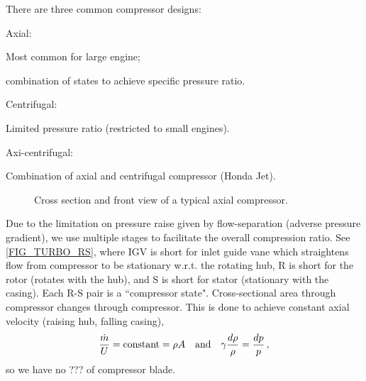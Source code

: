 There are three common compressor designs:
\begin{itemizePacked}
\item Axial:
  \begin{itemizePacked}
  \item Most common for large engine;
  \item combination of states to achieve specific pressure ratio.
  \end{itemizePacked}
\item Centrifugal:
  \begin{itemizePacked}
  \item Limited pressure ratio (restricted to small engines).
  \end{itemizePacked}
\item Axi-centrifugal:
  \begin{itemizePacked}
  \item Combination of axial and centrifugal compressor (Honda Jet).
  \end{itemizePacked}
\end{itemizePacked}

\begin{figure}[!htb!]
 \centering
    \caption{\label{FIG_TURBO_R}Cross section and front view of a typical axial compressor.}
\end{figure}

Due to the limitation on pressure raise given by flow-separation (adverse pressure gradient), we use multiple stages to facilitate the overall compression ratio. See \cref{FIG_TURBO_RS}, where IGV is short for inlet guide vane which straightens flow from compressor to be stationary w.r.t. the rotating hub, R is short for the rotor (rotates with the hub), and S is short for stator (stationary with the casing). Each R-S pair is a ``compressor state". Cross-sectional area through compressor changes through compressor. This is done to achieve constant axial velocity (raising hub, falling casing),
\[
{\frac{\dot{m}}{U}} = \text{constant} = \rho A \quad \text{and} \quad \gamma {\frac{d\rho}{\rho}} = {\frac{dp}{p}}\,,
\]
so we have no ??? of compressor blade.

